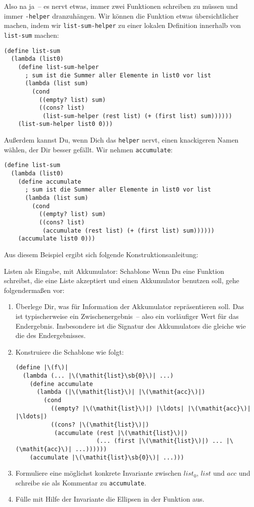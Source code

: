 Also na ja~-- es nervt etwas, immer zwei Funktionen schreiben zu müssen
und immer \lstinline{-helper} dranzuhängen.  Wir können die Funktion
etwas übersichtlicher machen, indem wir \lstinline{list-sum-helper} zu einer
lokalen Definition innerhalb von \lstinline{list-sum} machen:
%
\begin{lstlisting}
(define list-sum
  (lambda (list0)
    (define list-sum-helper
      ; sum ist die Summer aller Elemente in list0 vor list
      (lambda (list sum)
        (cond
          ((empty? list) sum)
          ((cons? list)
           (list-sum-helper (rest list) (+ (first list) sum))))))
    (list-sum-helper list0 0)))
\end{lstlisting}
%
Außerdem kannst Du, wenn Dich das \lstinline{helper} nervt, einen
knackigeren Namen wählen, der Dir besser gefällt.  Wir nehmen
\lstinline{accumulate}:
%
\begin{lstlisting}
(define list-sum
  (lambda (list0)
    (define accumulate
      ; sum ist die Summer aller Elemente in list0 vor list
      (lambda (list sum)
        (cond
          ((empty? list) sum)
          ((cons? list)
           (accumulate (rest list) (+ (first list) sum))))))
    (accumulate list0 0)))
\end{lstlisting}
%
Aus diesem Beispiel ergibt sich folgende Konstruktionsanleitung:
%
\begin{konstruktionsanleitung}{Listen als Eingabe, mit Akkumulator: Schablone}
  \label{ka:listen-eingabe-akkumulator-schablone}
  Wenn Du eine Funktion schreibst, die eine Liste akzeptiert und
  einen Akkumulator benutzen soll, gehe folgendermaßen vor:
  \begin{enumerate}
  \item Überlege Dir, was für Information der Akkumulator
    repräsentieren soll. Das ist typischerweise ein
    Zwischenergebnis~-- also ein vorläufiger Wert für das
    Endergebnis.  Insbesondere ist die Signatur des Akkumulators die
    gleiche wie die des Endergebnisses.
  \item Konstruiere die Schablone wie folgt:
\begin{lstlisting}
(define |\(f\)|
  (lambda (... |\(\mathit{list}\sb{0}\)| ...)
    (define accumulate
      (lambda (|\(\mathit{list}\)| |\(\mathit{acc}\)|)
        (cond
          ((empty? |\(\mathit{list}\)|) |\ldots| |\(\mathit{acc}\)| |\ldots|)
          ((cons? |\(\mathit{list}\)|)
           (accumulate (rest |\(\mathit{list}\)|) 
                       (... (first |\(\mathit{list}\)|) ... |\(\mathit{acc}\)| ...))))))
    (accumulate |\(\mathit{list}\sb{0}\)| ...)))
\end{lstlisting}
    \item Formuliere eine möglichst konkrete Invariante zwischen
      $\mathit{list}_0$, $\mathit{list}$ und $\mathit{acc}$ und
      schreibe sie als Kommentar zu \lstinline{accumulate}.
    \item Fülle mit Hilfe der Invariante die Ellipsen in der Funktion aus.
  \end{enumerate}
\end{konstruktionsanleitung}
